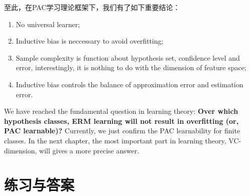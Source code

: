 \documentclass{article}
\begin{document}
	至此，在PAC学习理论框架下，我们有了如下重要结论：
\begin{enumerate}
\item No universal learner;
\item Inductive bias is neccessary to avoid overfitting;
\item Sample complexity is function about hypothesis set, confidence level and error, interestingly, it is nothing to do with the dimension of feature space;
\item Inductive bias controls the balance of approximation error and estimation error.
\end{enumerate}

	We have reached the fundamental question in learning theory: \textbf{Over which hypothesis classes, ERM learning will not result in overfitting (or, PAC learnable)?} Currently, we just confirm the PAC learnability for finite classes. In the next chapter, the most important part in learning theory, VC-dimension, will gives a more precise answer.


\section{练习与答案}
\end{document}
